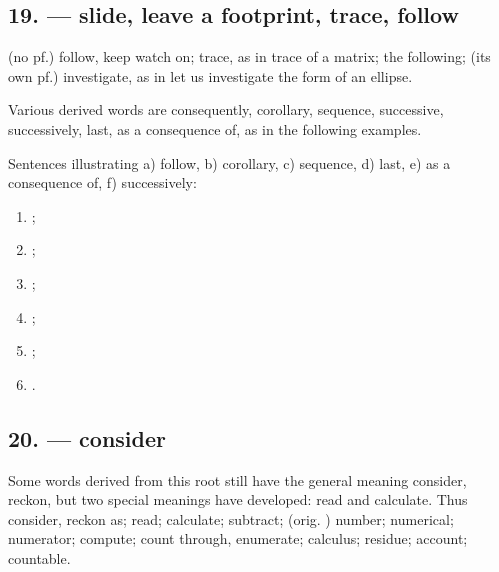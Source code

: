 \subsection*{19.  --- slide, leave a footprint, trace, follow}

 (no pf.) follow, keep watch on;  trace, as in  trace of a matrix;  the following;  (its own pf.) investigate, as in  let us investigate the form of an ellipse.

Various derived words are  consequently,  corollary,  sequence,  successive,  successively,  last,  as a consequence of, as in the following examples.

Sentences illustrating a)  follow, b)  corollary, c)  sequence, d)  last, e)  as a consequence of, f)  successively:

\begin{enumerate}[label=\alph*)]
\item {};
\item {};
\item {};
\item {};
\item {};
\item {}.
\end{enumerate}

\subsection*{20.  --- consider}

Some words derived from this root still have the general meaning consider, reckon, but two special meanings have developed: read and calculate. Thus  consider, reckon as;  read;  calculate;  subtract;  (orig. ) number;  numerical;  numerator;  compute;  count through, enumerate;  calculus;  residue;  account;  countable.

